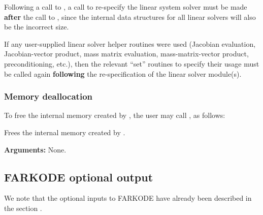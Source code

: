 \documentclass[letterpaper,10pt,english]{sphinxmanual}
\begin{document}
Following a call to {\hyperref[f_interface/Usage:f/_/FARKRESIZE]{\emph{}}}, a call to re-specify the
linear system solver must be made \textbf{after} the call to
{\hyperref[f_interface/Usage:f/_/FARKRESIZE]{\emph{}}}, since the internal data structures for all
linear solvers will also be the incorrect size.

If any user-supplied linear solver helper routines were used (Jacobian
evaluation, Jacobian-vector product, mass matrix evaluation,
mass-matrix-vector product, preconditioning, etc.), then the
relevant ``set'' routines to specify their usage must be called again
\textbf{following} the re-specification of the linear solver module(s).


\subsubsection{Memory deallocation}
\label{f_interface/Usage:finterface-deallocation}\label{f_interface/Usage:memory-deallocation}
To free the internal memory created by {\hyperref[f_interface/Usage:f/_/FARKMALLOC]{\emph{}}}, the user
may call {\hyperref[f_interface/Usage:f/_/FARKFREE]{\emph{}}}, as follows:

\begin{fulllineitems}
\label{f_interface/Usage:f/_/FARKFREE}
Frees the internal memory created by {\hyperref[f_interface/Usage:f/_/FARKMALLOC]{\emph{}}}.

\textbf{Arguments:} None.

\end{fulllineitems}



\subsection{FARKODE optional output}
\label{f_interface/Optional_output:finterface-optionaloutputs}\label{f_interface/Optional_output:farkode-optional-output}\label{f_interface/Optional_output::doc}
We note that the optional inputs to FARKODE have already been
described in the section {\hyperref[f_interface/Usage:finterface-optionalinputs]{\emph{}}}.
\end{document}
